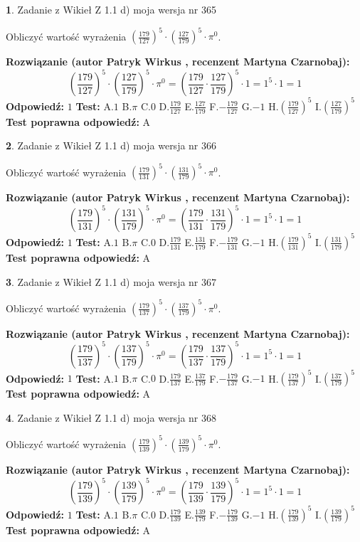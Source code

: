 \documentclass[12pt, a4paper]{article}
\theoremstyle{definition} %
\newtheorem{zad}{}
\newcommand{\zadStart}[1]{\begin{zad}#1\newline}
\newcommand{\zadStop}{\end{zad}}
\newcommand{\rozwStart}[2]{\noindent \textbf{Rozwiązanie (autor #1 , recenzent #2): }\newline}
\newcommand{\rozwStop}{\newline}
\newcommand{\odpStart}{\noindent \textbf{Odpowiedź:}\newline}
\newcommand{\odpStop}{\newline}
\newcommand{\testStart}{\noindent \textbf{Test:}\newline}
\newcommand{\testStop}{\newline}
\newcommand{\kluczStart}{\noindent \textbf{Test poprawna odpowiedź:}\newline}
\newcommand{\kluczStop}{\newline}
\begin{document}
\zadStart{Zadanie z Wikieł Z 1.1 d) moja wersja nr 365}

Obliczyć wartość wyrażenia $(\frac{179}{127})^{5} \cdot (\frac{127}{179})^{5} \cdot \pi^{0}$.
\zadStop
\rozwStart{Patryk Wirkus}{Martyna Czarnobaj}
$$(\frac{179}{127})^{5} \cdot (\frac{127}{179})^{5} \cdot \pi^{0} = (\frac{179}{127} \cdot \frac{127}{179})^{5} \cdot 1 = 1^{5} \cdot 1 = 1$$
\rozwStop
\odpStart
$1$
\odpStop
\testStart
A.$1$ B.$\pi$ C.$0$ D.$\frac{179}{127}$ E.$\frac{127}{179}$
F.$-\frac{179}{127}$ G.$-1$
H.$(\frac{179}{127})^{5}$
I.$(\frac{127}{179})^{5}$
\testStop
\kluczStart
A
\kluczStop



\zadStart{Zadanie z Wikieł Z 1.1 d) moja wersja nr 366}

Obliczyć wartość wyrażenia $(\frac{179}{131})^{5} \cdot (\frac{131}{179})^{5} \cdot \pi^{0}$.
\zadStop
\rozwStart{Patryk Wirkus}{Martyna Czarnobaj}
$$(\frac{179}{131})^{5} \cdot (\frac{131}{179})^{5} \cdot \pi^{0} = (\frac{179}{131} \cdot \frac{131}{179})^{5} \cdot 1 = 1^{5} \cdot 1 = 1$$
\rozwStop
\odpStart
$1$
\odpStop
\testStart
A.$1$ B.$\pi$ C.$0$ D.$\frac{179}{131}$ E.$\frac{131}{179}$
F.$-\frac{179}{131}$ G.$-1$
H.$(\frac{179}{131})^{5}$
I.$(\frac{131}{179})^{5}$
\testStop
\kluczStart
A
\kluczStop



\zadStart{Zadanie z Wikieł Z 1.1 d) moja wersja nr 367}

Obliczyć wartość wyrażenia $(\frac{179}{137})^{5} \cdot (\frac{137}{179})^{5} \cdot \pi^{0}$.
\zadStop
\rozwStart{Patryk Wirkus}{Martyna Czarnobaj}
$$(\frac{179}{137})^{5} \cdot (\frac{137}{179})^{5} \cdot \pi^{0} = (\frac{179}{137} \cdot \frac{137}{179})^{5} \cdot 1 = 1^{5} \cdot 1 = 1$$
\rozwStop
\odpStart
$1$
\odpStop
\testStart
A.$1$ B.$\pi$ C.$0$ D.$\frac{179}{137}$ E.$\frac{137}{179}$
F.$-\frac{179}{137}$ G.$-1$
H.$(\frac{179}{137})^{5}$
I.$(\frac{137}{179})^{5}$
\testStop
\kluczStart
A
\kluczStop



\zadStart{Zadanie z Wikieł Z 1.1 d) moja wersja nr 368}

Obliczyć wartość wyrażenia $(\frac{179}{139})^{5} \cdot (\frac{139}{179})^{5} \cdot \pi^{0}$.
\zadStop
\rozwStart{Patryk Wirkus}{Martyna Czarnobaj}
$$(\frac{179}{139})^{5} \cdot (\frac{139}{179})^{5} \cdot \pi^{0} = (\frac{179}{139} \cdot \frac{139}{179})^{5} \cdot 1 = 1^{5} \cdot 1 = 1$$
\rozwStop
\odpStart
$1$
\odpStop
\testStart
A.$1$ B.$\pi$ C.$0$ D.$\frac{179}{139}$ E.$\frac{139}{179}$
F.$-\frac{179}{139}$ G.$-1$
H.$(\frac{179}{139})^{5}$
I.$(\frac{139}{179})^{5}$
\testStop
\kluczStart
A
\kluczStop
\end{document}
